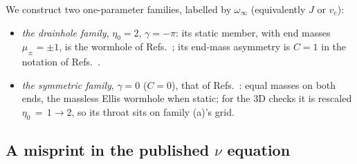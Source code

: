 \documentclass[twocolumn,floatfix,aps,prd,superscriptaddress,nofootinbib]{revtex4-2}
\begin{document}
We construct two one-parameter families, labelled by $\omega_\infty$ (equivalently $J$ or $v_e$):
\begin{itemize}
\item[(a)] \emph{the drainhole family}, $\eta_0=2$, $\gamma=-\pi$: its static member, with end masses $\mu_\pm=\pm1$, is the wormhole of Refs.~\cite{shirokov2026,shirokov2026c}; its end-mass asymmetry is $C=1$ in the notation of Refs.~\cite{azad2023,azad2024}.
\item[(b)] \emph{the symmetric family}, $\gamma=0$ ($C=0$), that of Refs.~\cite{kleihaus_kunz2014,chew2016}: equal masses on both ends, the massless Ellis wormhole when static; for the 3D checks it is rescaled $\eta_0\,{=}\,1\to2$, so its throat sits on family (a)'s grid.
\end{itemize}

\subsection{A misprint in the published $\nu$ equation}
\label{sec:model:eq12}
\end{document}
